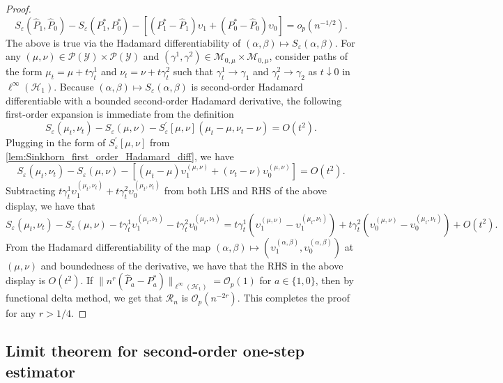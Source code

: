 \documentclass{article}
\theoremstyle{plain}
\theoremstyle{definition}
\theoremstyle{remark}
\newcommand{\off}[1]{\left[#1\right]}
\newcommand{\cH}{\mathcal{H}}
\newcommand{\cR}{\mathcal{R}}
\newcommand{\cP}{\mathcal{P}}
\newcommand{\cO}{\mathcal{O}}
\newcommand{\cM}{\mathcal{M}}
\newcommand{\cY}{\mathcal{Y}}
\newcommand{\hP}{\widehat{P}}
\newcommand{\1}{\mathbbm{1}}
\newcommand{\eps}{\varepsilon}
\theoremstyle{plain}
\theoremstyle{definition}
\begin{document}
\begin{proof}
\begin{equation}\label{eq:sinkhorn_remainder}
    S_\eps(\hP_1, \hP_0) - S_\eps(P_1^*, P_0^*) - \off{(P_1^* - \hP_1) \upsilon_1 + (P_0^*-\hP_0) \upsilon_0} = o_p(n^{-1/2}).
\end{equation}
The above is true via the Hadamard differentiability of $(\alpha, \beta) \mapsto S_\eps(\alpha, \beta)$.
For any $(\mu, \nu) \in \cP(\cY) \times \cP(\cY)$ and $(\gamma^1, \gamma^2) \in \cM_{0, \mu} \times \cM_{0, \mu}$, consider paths of the form $\mu_t = \mu + t \gamma_t^1$ and $\nu_t = \nu + t \gamma_t^2$ such that $\gamma_t^1 \to \gamma_1$ and $\gamma_t^2 \to \gamma_2$ as $t \downarrow 0$ in $\ell^\infty(\cH_1)$. Because $(\alpha, \beta) \mapsto S_\eps(\alpha, \beta)$ is second-order Hadamard differentiable with a bounded second-order Hadamard derivative, the following first-order expansion is immediate from the definition
\[
S_\eps(\mu_t, \nu_t)- S_\eps(\mu, \nu) - S_\eps^\prime[\mu, \nu](\mu_t - \mu, \nu_t - \nu) = O(t^2).
\]
Plugging in the form of $S_\eps^\prime[\mu, \nu]$ from \cref{lem:Sinkhorn_first_order_Hadamard_diff}, we have
\[
S_\eps(\mu_t, \nu_t)- S_\eps(\mu, \nu) - \off{(\mu_t - \mu)\upsilon_1^{(\mu, \nu)} + (\nu_t - \nu) \upsilon_0^{(\mu, \nu)}} = O(t^2).
\]
Subtracting $t\gamma_t^1 \upsilon_1^{(\mu_t, \nu_t)} + t\gamma_t^2 \upsilon_0^{(\mu_t, \nu_t)}$ from both LHS and RHS of the above display, we have that 
\[
S_\eps(\mu_t, \nu_t)- S_\eps(\mu, \nu) -t \gamma_t^1 \upsilon_1^{(\mu_t, \nu_t)} - t \gamma_t^2 \upsilon_0^{(\mu_t, \nu_t)} = 
t \gamma_t^1 (\upsilon_1^{(\mu, \nu)} - \upsilon_1^{(\mu_t, \nu_t)}) +t \gamma_t^2 (\upsilon_0^{(\mu, \nu)} - \upsilon_0^{(\mu_t, \nu_t)}) + O(t^2).
\]
From the Hadamard differentiability of the map $(\alpha, \beta) \mapsto (\upsilon_1^{(\alpha, \beta)}, \upsilon_0^{(\alpha, \beta)})$ at $(\mu, \nu)$ and boundedness of the derivative, we have that the RHS in the above display is $O(t^2)$. If $\|n^r(\hP_a - P^*_a)\|_{\ell^\infty(\cH_1)} = \cO_p(1)$ for $a \in \{1,0\}$, then by functional delta method, we get that $\cR_n$ is $\cO_p(n^{-2r})$. This completes the proof for any $r > 1/4$.
\end{proof}





\subsection{Limit theorem for second-order one-step estimator}\label{appendix:proof_of_null_asymptotics}
\end{document}
